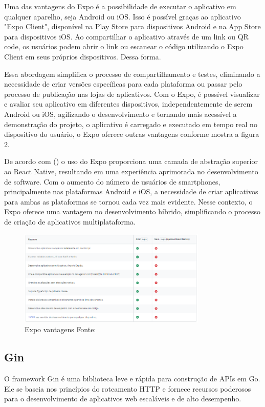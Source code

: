 Uma das vantagens do Expo é a possibilidade de executar o aplicativo em qualquer aparelho, seja Android ou iOS. Isso é possível graças ao aplicativo "Expo Client", disponível na Play Store para dispositivos Android e na App Store para dispositivos iOS. Ao compartilhar o aplicativo através de um link ou QR code, os usuários podem abrir o link ou escanear o código utilizando o Expo Client em seus próprios dispositivos. Dessa forma.

Essa abordagem simplifica o processo de compartilhamento e testes, eliminando a necessidade de criar versões específicas para cada plataforma ou passar pelo processo de publicação nas lojas de aplicativos. Com o Expo, é possível visualizar e avaliar seu aplicativo em diferentes dispositivos, independentemente de serem Android ou iOS, agilizando o desenvolvimento e tornando mais acessível a demonstração do projeto, o aplicativo é carregado e executado em tempo real no dispositivo do usuário, o Expo oferece outras vantagens conforme mostra a figura 2.

De acordo com (\textcite{Hugo}) o uso do Expo proporciona uma camada de abstração superior ao React Native, resultando em uma experiência aprimorada no desenvolvimento de software. Com o aumento do número de usuários de smartphones, principalmente nas plataformas Android e iOS, a necessidade de criar aplicativos para ambas as plataformas se tornou cada vez mais evidente. Nesse contexto, o Expo oferece uma vantagem no desenvolvimento híbrido, simplificando o processo de criação de aplicativos multiplataforma.

\begin{figure}[htb]
	\caption{\label{fig:Fig_1}Expo vantagens Fonte: \cite{Expo}}
	\begin{center}
		\includegraphics[width=0.8\textwidth]{images/expo.png}
	\end{center}
\end{figure}

\clearpage
\subsection{Gin}
O framework Gin é uma biblioteca leve e rápida para construção de APIs em Go. Ele se baseia nos princípios do roteamento HTTP e fornece recursos poderosos para o desenvolvimento de aplicativos web escaláveis e de alto desempenho.

